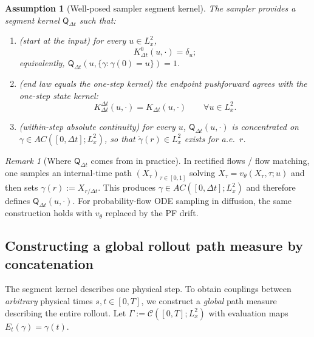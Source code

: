 \documentclass{article}
\numberwithin{equation}{section}
\theoremstyle{plain}
\newtheorem{assumption}[theorem]{Assumption}
\theoremstyle{definition}
\theoremstyle{remark}
\newtheorem{remark}[theorem]{Remark}
\newcommand{\Ccal}{\mathcal{C}}
\begin{document}
\begin{assumption}[Well-posed sampler segment kernel]\label{ass:segment-kernel}
The sampler provides a segment kernel $\mathsf{Q}_{\Delta t}$ such that:
\begin{enumerate}[label=(\roman*),leftmargin=2.2em]
\item (\emph{start at the input}) for every $u\in L^2_x$,
\begin{equation}\label{eq:segment-start}
K^0_{\Delta t}(u,\cdot)=\delta_u ;
\end{equation}
equivalently, $\mathsf{Q}_{\Delta t}(u,\{\gamma:\gamma(0)=u\})=1$.
\item (\emph{end law equals the one-step kernel}) the endpoint pushforward agrees with the one-step state kernel:
\begin{equation}\label{eq:segment-end}
K^{\Delta t}_{\Delta t}(u,\cdot)=K_{\Delta t}(u,\cdot)\qquad\forall u\in L^2_x.
\end{equation}
\item (\emph{within-step absolute continuity}) for every $u$, $\mathsf{Q}_{\Delta t}(u,\cdot)$ is concentrated on
$\gamma\in AC([0,\Delta t];L^2_x)$, so that $\dot\gamma(r)\in L^2_x$ exists for a.e.\ $r$.
\end{enumerate}
\end{assumption}

\begin{remark}[Where $\mathsf{Q}_{\Delta t}$ comes from in practice]
In rectified flows / flow matching, one samples an internal-time path $(X_\tau)_{\tau\in[0,1]}$ solving
$\dot X_\tau=v_\theta(X_\tau,\tau;u)$ and then sets $\gamma(r):=X_{r/\Delta t}$.
This produces $\gamma\in AC([0,\Delta t];L^2_x)$ and therefore defines $\mathsf{Q}_{\Delta t}(u,\cdot)$.
For probability-flow ODE sampling in diffusion, the same construction holds with $v_\theta$ replaced by the PF drift.
\end{remark}

\subsection{Constructing a global rollout path measure by concatenation}

The segment kernel describes one physical step. To obtain couplings between \emph{arbitrary} physical times
$s,t\in[0,T]$, we construct a \emph{global} path measure describing the entire rollout. Let $\Gamma:=\Ccal([0,T];L^2_x)$ with evaluation maps $E_t(\gamma)=\gamma(t)$.
\end{document}
